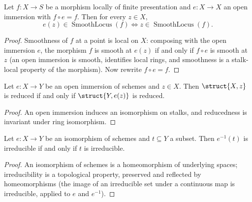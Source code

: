 \begin{lemma}
  \label{lem:smooth_locus_transport}
  \leanok
  Let \(f : X \to S\) be a morphism locally of finite presentation and
  \(e : X \to X\) an open immersion with \(f \circ e = f\). Then for every
  \(z \in X\),
  \[
    e(z) \in \operatorname{SmoothLocus}(f)
    \iff
    z \in \operatorname{SmoothLocus}(f).
  \]
\end{lemma}
\begin{proof}
  \leanok
  Smoothness of \(f\) at a point is local on \(X\): composing with the open
  immersion \(e\), the morphism \(f\) is smooth at \(e(z)\) if and only if
  \(f \circ e\) is smooth at \(z\) (an open immersion is smooth, identifies
  local rings, and smoothness is a stalk-local property of the morphism). Now
  rewrite \(f \circ e = f\).
\end{proof}

\begin{lemma}
  \label{lem:stalk_reduced_transport}
  \leanok
  Let \(e : X \to Y\) be an open immersion of schemes and \(z \in X\). Then
  \(\struct{X,z}\) is reduced if and only if \(\struct{Y, e(z)}\) is reduced.
\end{lemma}
\begin{proof}
  \leanok
  An open immersion induces an isomorphism on stalks, and reducedness is
  invariant under ring isomorphism.
\end{proof}

\begin{lemma}
  \label{lem:irreducible_transport}
  \leanok
  Let \(e : X \to Y\) be an isomorphism of schemes and \(t \subseteq Y\) a
  subset. Then \(e^{-1}(t)\) is irreducible if and only if \(t\) is
  irreducible.
\end{lemma}
\begin{proof}
  \leanok
  An isomorphism of schemes is a homeomorphism of underlying spaces;
  irreducibility is a topological property, preserved and reflected by
  homeomorphisms (the image of an irreducible set under a continuous map is
  irreducible, applied to \(e\) and \(e^{-1}\)).
\end{proof}

